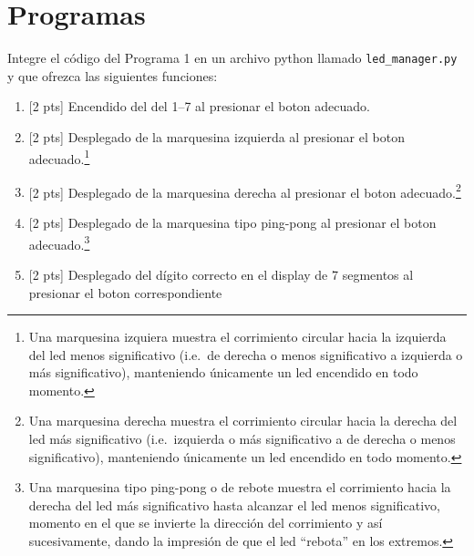 %
%


\section{Programas}%
\label{sec:programs}

Integre el código del Programa 1 en un archivo python llamado \texttt{led\_manager.py} y que ofrezca las siguientes funciones:
\begin{enumerate}
	\item{} [2 pts] Encendido del del 1--7 al presionar el boton adecuado.

	\item{} [2 pts] Desplegado de la marquesina izquierda al presionar el boton adecuado.\footnote{Una marquesina izquiera muestra el corrimiento circular hacia la izquierda del led menos significativo (i.e.~de derecha o menos significativo a izquierda o más significativo), manteniendo únicamente un led encendido en todo momento.}

	\item{} [2 pts] Desplegado de la marquesina derecha al presionar el boton adecuado.\footnote{Una marquesina derecha muestra el corrimiento circular hacia la derecha del led más significativo (i.e.~izquierda o más significativo a de derecha o menos significativo), manteniendo únicamente un led encendido en todo momento.}

	\item{} [2 pts] Desplegado de la marquesina tipo ping-pong al presionar el boton adecuado.\footnote{Una marquesina tipo ping-pong o de rebote muestra el corrimiento hacia la derecha del led más significativo hasta alcanzar el led menos significativo, momento en el que se invierte la dirección del corrimiento y así sucesivamente, dando la impresión de que el led \enquote{rebota} en los extremos.}

	\item{} [2 pts] Desplegado del dígito correcto en el display de 7 segmentos al presionar el boton correspondiente
\end{enumerate}
